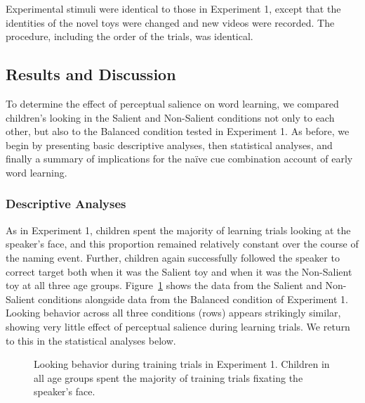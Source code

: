 \documentclass[man,floatsintext]{apa6}
\begin{document}
Experimental stimuli were identical to those in Experiment 1, except that the identities of the novel toys were changed and new videos were recorded. The procedure, including the order of the trials, was identical.

\subsection{Results and Discussion}

To determine the effect of perceptual salience on word learning, we compared children's looking in the Salient and Non-Salient conditions not only to each other, but also to the Balanced condition tested in Experiment 1. As before, we begin by presenting basic descriptive analyses, then statistical analyses, and finally a summary of implications for the na\"{i}ve cue combination account of early word learning.

\subsubsection{Descriptive Analyses}

As in Experiment 1, children spent the majority of learning trials looking at the speaker's face, and this proportion remained relatively constant over the course of the naming event. Further, children again successfully followed the speaker to correct target both when it was the Salient toy and when it was the Non-Salient toy at all three age groups. Figure~\ref{fig:exp1and2_train_spaghetti} shows the data from the Salient and Non-Salient conditions alongside data from the Balanced condition of Experiment 1. Looking behavior across all three conditions (rows) appears strikingly similar, showing very little effect of perceptual salience during learning trials. We return to this in the statistical analyses below.

\begin{figure}[tb]
	\caption{\label{fig:exp1and2_train_spaghetti} Looking behavior during training trials in Experiment 1. Children in all age groups spent the majority of training trials fixating the speaker's face.}
\end{figure}
\end{document}
